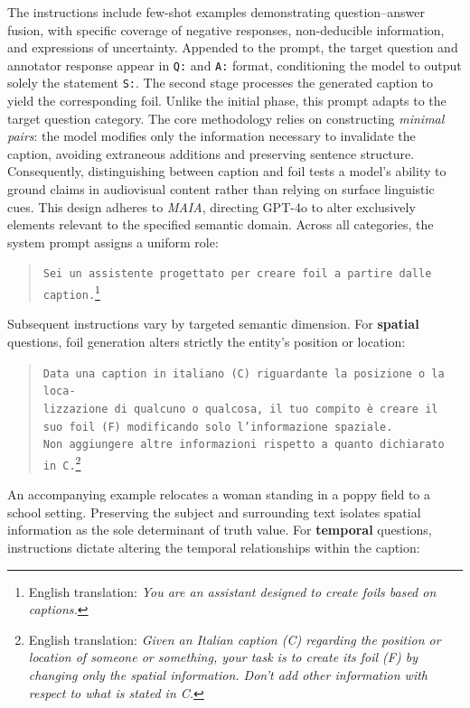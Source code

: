 The instructions include few-shot examples demonstrating question--answer fusion, with specific coverage of negative responses, non-deducible information, and expressions of uncertainty. Appended to the prompt, the target question and annotator response appear in \texttt{Q:} and \texttt{A:} format, conditioning the model to output solely the statement \texttt{S:}.
The second stage processes the generated caption to yield the corresponding foil. Unlike the initial phase, this prompt adapts to the target question category. The core methodology relies on constructing \textit{minimal pairs}: the model modifies only the information necessary to invalidate the caption, avoiding extraneous additions and preserving sentence structure. Consequently, distinguishing between caption and foil tests a model's ability to ground claims in audiovisual content rather than relying on surface linguistic cues. This design adheres to \textit{MAIA}, directing GPT-4o to alter exclusively elements relevant to the specified semantic domain.
Across all categories, the system prompt assigns a uniform role:
\begin{quote}
\small
\texttt{Sei un assistente progettato per creare foil a partire dalle caption.}\footnote{English translation: \textit{You are an assistant designed to create foils based on captions.}}
\end{quote}
Subsequent instructions vary by targeted semantic dimension. For \textbf{spatial} questions, foil generation alters strictly the entity's position or location:
\begin{quote}
\small
\texttt{Data una caption in italiano (C) riguardante la posizione o la loca-\\lizzazione di qualcuno o qualcosa, il tuo compito è creare il suo foil (F) modificando solo l'informazione spaziale.}\\
\texttt{Non aggiungere altre informazioni rispetto a quanto dichiarato in C.}\footnote{English translation: \textit{Given an Italian caption (C) regarding the position or location of someone or something, your task is to create its foil (F) by changing only the spatial information. Don't add other information with respect to what is stated in C.}}
\end{quote}
An accompanying example relocates a woman standing in a poppy field to a school setting. Preserving the subject and surrounding text isolates spatial information as the sole determinant of truth value.
For \textbf{temporal} questions, instructions dictate altering the temporal relationships within the caption:

